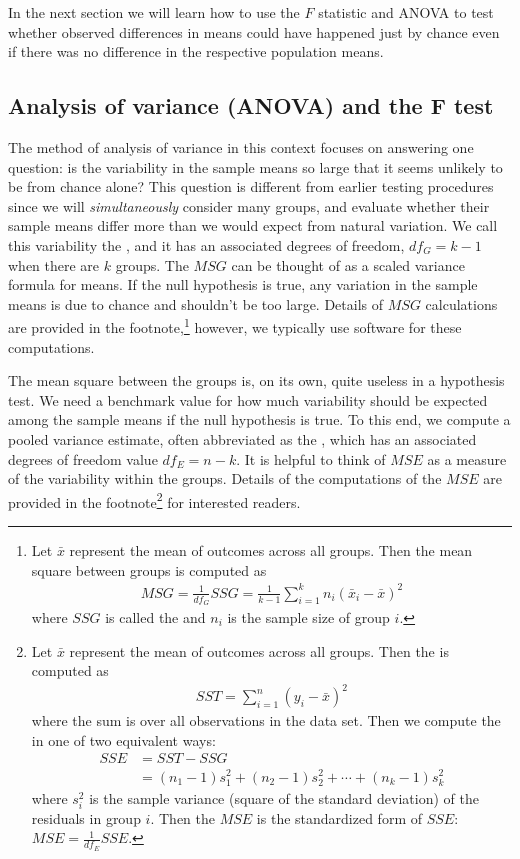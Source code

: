 In the next section we will learn how to use the $F$ statistic and ANOVA to test whether observed differences in means could have happened just by chance even if there was no difference in the respective population means.


\subsection{Analysis of variance (ANOVA) and the F test}

The method of analysis of variance in this context focuses on answering one question: is the variability in the sample means so large that it seems unlikely to be from chance alone? This question is different from earlier testing procedures since we will \emph{simultaneously} consider many groups, and evaluate whether their sample means differ more than we would expect from natural variation. We call this variability the , and it has an associated degrees of freedom, $df_{G}=k-1$ when there are $k$ groups. The $MSG$ can be thought of as a scaled variance formula for means. If the null hypothesis is true, any variation in the sample means is due to chance and shouldn't be too large. Details of $MSG$ calculations are provided in the footnote,\footnote{Let $\bar{x}$ represent the mean of outcomes across all groups. Then the mean square between groups is computed as
\begin{align*}
MSG = \frac{1}{df_{G}}SSG = \frac{1}{k-1}\sum_{i=1}^{k} n_{i}\left(\bar{x}_{i} - \bar{x}\right)^2
\end{align*}
where $SSG$ is called the  and $n_{i}$ is the sample size of group $i$.} however, we typically use software for these computations.

The mean square between the groups is, on its own, quite useless in a hypothesis test. We need a benchmark value for how much variability should be expected among the sample means if the null hypothesis is true. To this end, we compute a pooled variance estimate, often abbreviated as the , which has an associated degrees of freedom value $df_E=n-k$. It is helpful to think of $MSE$ as a measure of the variability within the groups. Details of the computations of the $MSE$ are provided in the footnote\footnote{Let $\bar{x}$ represent the mean of outcomes across all groups. Then the  is computed as
\begin{align*}
SST = \sum_{i=1}^{n} \left(y_{i} - \bar{x}\right)^2
\end{align*}
where the sum is over all observations in the data set. Then we compute the  in one of two equivalent ways:
\begin{align*}
SSE &= SST - SSG \\
	&= (n_1-1)s_1^2 + (n_2-1)s_2^2 + \cdots + (n_k-1)s_k^2
\end{align*}
where $s_i^2$ is the sample variance (square of the standard deviation) of the residuals in group $i$. Then the $MSE$ is the standardized form of $SSE$: $MSE = \frac{1}{df_{E}}SSE$.} for interested readers.

